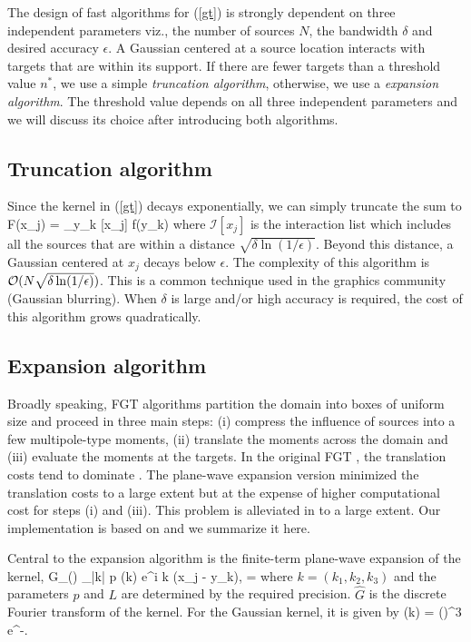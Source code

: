 
The design of fast algorithms for (\ref{gt}) is strongly dependent on three independent parameters viz., the number of sources $N$, the bandwidth $\delta$ and desired accuracy $\epsilon$. A Gaussian centered at a source location interacts with targets that are within its support. If there are fewer targets than a threshold value $n^*$, we use a simple {\em truncation algorithm}, otherwise, we use a {\em expansion algorithm}. The threshold  value depends on all three independent parameters and we will discuss its choice after introducing both algorithms. 

\subsection{Truncation algorithm} 
Since the kernel in (\ref{gt}) decays exponentially, we can simply truncate the sum to
%
\beq F(x_j) = \sum_{y_k \in {}[x_j]}  f(y_k) \eeq
%
where $\mathcal{I}[x_j]$ is the interaction list which includes all the sources that are within a distance $\sqrt{\delta \ln (1/\epsilon)}$. Beyond this distance, a Gaussian centered at $x_j$ decays below $\epsilon$. The complexity of this algorithm is $\mathcal{O}(N \sqrt{\delta \ln(1/\epsilon)})$. This is a common technique used in the graphics community (Gaussian blurring). When $\delta$ is large and/or high accuracy is required, the cost of this algorithm grows quadratically.  

\subsection{Expansion algorithm}
Broadly speaking, FGT algorithms \cite{fgt, greengard98} partition the domain into boxes of uniform size and proceed in three main steps: (i) compress the influence of sources into a few multipole-type moments, (ii) translate the moments across the domain and (iii) evaluate the moments at the targets. In the original FGT \cite{fgt}, the translation costs tend to dominate \cite{fggt}. The plane-wave expansion version \cite{greengard98} minimized the translation costs to a large extent but at the expense of higher computational cost for steps (i) and (iii). This problem is alleviated in \cite{fggt} to a large extent. Our implementation is based on \cite{fggt} and we summarize it here. 

Central to the expansion algorithm is the finite-term plane-wave expansion of the kernel,
\beq G_\delta() \approx \sum_{|k| \leq p} (k) e^{i \lambda k \cdot (x_j - y_k)}, \quad \lambda = \eeq
where $k = (k_1, k_2, k_3)$ and the parameters $p$ and $L$ are determined by the required precision. $\hat{G}$ is the discrete Fourier transform of the kernel. For the Gaussian kernel, it is given by
\beq {}(k) = \left(\right)^3 e^{-}. \label{eqn:ghat}\eeq

